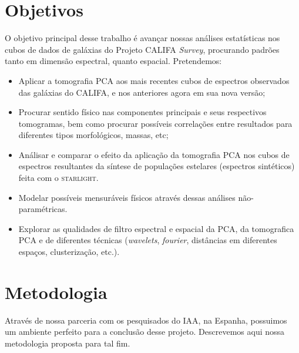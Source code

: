 \documentclass[a4paper,12pt]{article}
\def\starlight{\textsc{starlight}\xspace}      %
\begin{document}
\section{Objetivos}
O objetivo principal desse trabalho é avançar nossas análises estatísticas nos cubos de dados de galáxias do Projeto CALIFA {\em Survey}, procurando
padrões tanto em dimensão espectral, quanto espacial. Pretendemos:
\begin{itemize}
  \item Aplicar a tomografia PCA aos mais recentes cubos de espectros observados das galáxias do CALIFA, e nos anteriores agora em sua nova versão;
  \item Procurar sentido físico nas componentes principais e seus respectivos tomogramas, bem como procurar possíveis correlações entre resultados
  para diferentes tipos morfológicos, massas, etc;
  \item Análisar e comparar o efeito da aplicação da tomografia PCA nos cubos de espectros resultantes da síntese de populações estelares (espectros
  sintéticos) feita com o \starlight.
  \item Modelar possíveis mensuráveis físicos através dessas análises não-paramétricas.
  \item Explorar as qualidades de filtro espectral e espacial da PCA, da tomografica PCA e de diferentes técnicas ({\em wavelets}, {\em fourier},
  distâncias em diferentes espaços, clusterização, etc.). 
\end{itemize}

\section{Metodologia}
Através de nossa parceria com os pesquisados do IAA, na Espanha, possuimos um ambiente perfeito para a conclusão desse projeto. Descrevemos aqui nossa
metodologia proposta para tal fim.
\end{document}
